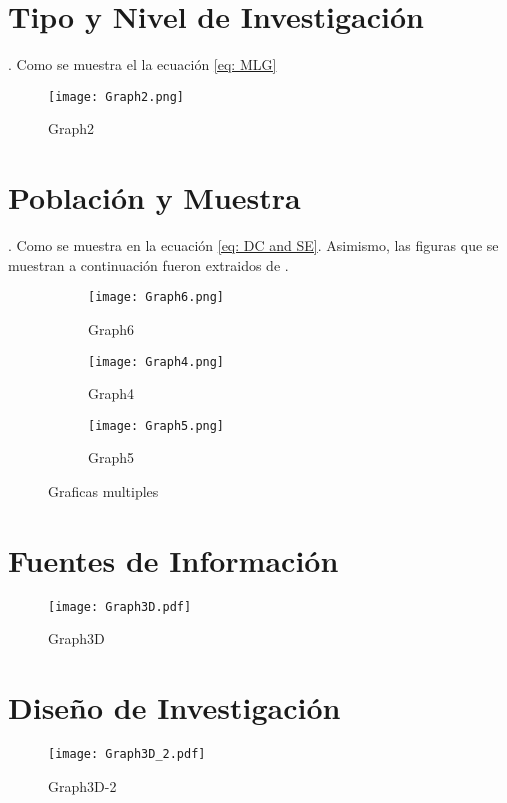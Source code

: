 			\section{Tipo y Nivel de Investigación}\label{Sec: Tipo y Nivel de Investigación}
				\lipsum[1]. Como se muestra el la ecuación \textcolor{blue}{\eqref{eq: MLG}}
				\begin{figure}[h!]
					\centering
					\texttt{[image: Graph2.png]}
					\caption{Graph2}
					\label{fig: Graph2}
				\end{figure}
			\section{Población y Muestra}\label{Sec:Población y Muestra}
				\lipsum[1]. Como se muestra en la ecuación \textcolor{blue}{\eqref{eq: DC and SE}}. Asimismo, las figuras que se muestran a continuación fueron extraidos de \textcolor{blue}{\cite{Huang-2022}}.
				\begin{figure}[h!]
					\centering
					\begin{subfigure}[b]{0.3\textwidth}
						\centering
						\texttt{[image: Graph6.png]}
						\caption{Graph6}
						\label{subfig: Graph6}
					\end{subfigure}
					\hfill
					\begin{subfigure}[b]{0.3\textwidth}
						\centering
						\texttt{[image: Graph4.png]}
						\caption{Graph4}
						\label{subfig: Graph4}
					\end{subfigure}
					\hfill
					\begin{subfigure}[b]{0.3\textwidth}
						\centering
						\texttt{[image: Graph5.png]}
						\caption{Graph5}
						\label{subfig: Graph5}
					\end{subfigure}
					\caption{Graficas multiples}
					\label{fig: Graficas multiples}
				\end{figure}
			\section{Fuentes de Información}\label{Sec: Fuentes de Información}
				\lipsum[1]
				\begin{figure}[ht]
					\centering
					\texttt{[image: Graph3D.pdf]}
					\caption{Graph3D}
					\label{fig: Graph3D}
				\end{figure}
			\section{Diseño de Investigación}\label{Sec: Diseño de Investigación}
				\lipsum[1]
				\begin{figure}[ht]
					\centering
					\texttt{[image: Graph3D\_2.pdf]}
					\caption{Graph3D-2}
					\label{fig: Graph3D-2}
				\end{figure}
